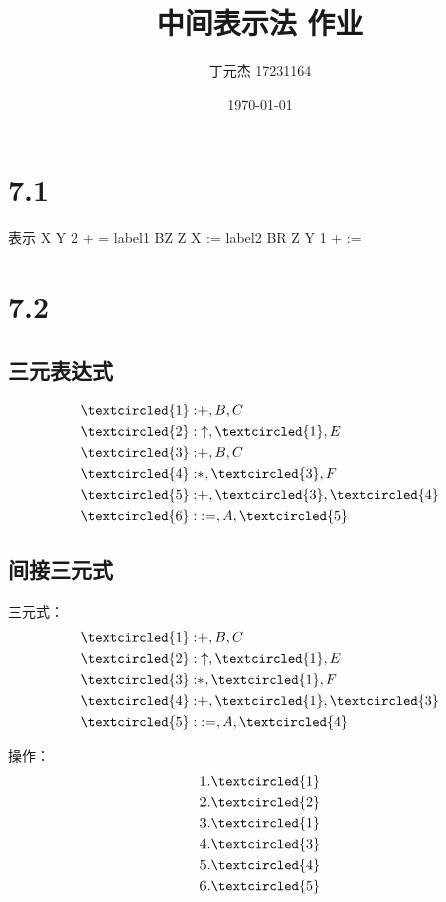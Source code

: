 \documentclass[UTF8]{ctexart}
\title{中间表示法 作业}
\author{丁元杰 17231164}
\date{\today}
\begin{document}
\maketitle

\section*{7.1}
表示
X Y 2 + = label1 BZ Z X :=  label2 BR Z Y 1 + :=

\section*{7.2}
\subsection*{三元表达式}
\begin{align*}
    \textcircled{1}: & +, B, C \\
    \textcircled{2}: & \uparrow, \textcircled{1}, E\\
    \textcircled{3}: & +, B, C \\
    \textcircled{4}: & *, \textcircled{3}, F\\
    \textcircled{5}: & +, \textcircled{3}, \textcircled{4}\\
    \textcircled{6}: & :=, A, \textcircled{5}
\end{align*}

\subsection*{间接三元式}

三元式：
\begin{align*}
    \textcircled{1}: & +, B, C \\
    \textcircled{2}: & \uparrow, \textcircled{1}, E\\
    \textcircled{3}: & *, \textcircled{1}, F\\
    \textcircled{4}: & +, \textcircled{1}, \textcircled{3}\\
    \textcircled{5}: & :=, A, \textcircled{4}
\end{align*}

操作：
\begin{align*}
    1. \textcircled{1} \\
    2. \textcircled{2} \\
    3. \textcircled{1} \\
    4. \textcircled{3} \\
    5. \textcircled{4} \\
    6. \textcircled{5} \\
\end{align*}
\end{document}
